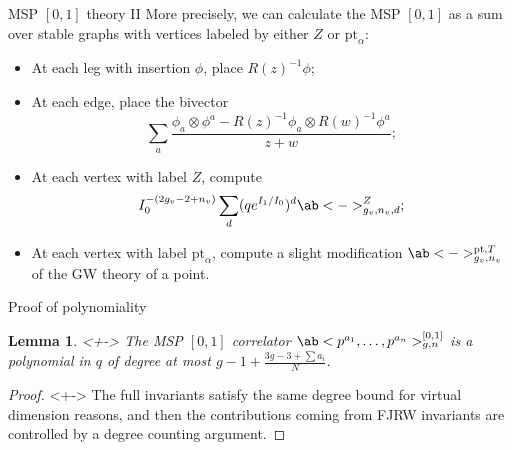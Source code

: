 \documentclass[10pt]{beamer}
\newcommand{\mr}[1]{\mathrm{#1}}
\newcommand{\1}{\mathbf{1}}
\newcommand{\2}{\mathbf{2}}
\newcommand{\3}{\mathbf{3}}
\newcommand{\pt}{\mr{pt}}
\newtheorem{lem}[thm]{Lemma}
\theoremstyle{definition}
\theoremstyle{remark}
\theoremstyle{plain}
\theoremstyle{definition}
\theoremstyle{remark}
\begin{document}
\begin{frame}{MSP $[0,1]$ theory II}
  More precisely, we can calculate the MSP $[0,1]$ as a sum over stable graphs with vertices labeled by either $Z$ or $\pt_{\alpha}$:
  \begin{itemize}[<+->]
    \item At each leg with insertion $\phi$, place $R(z)^{-1}\phi$;
    \item At each edge, place the bivector
    \[ \sum_{a} \frac{\phi_a \otimes \phi^a - R(z)^{-1}\phi_a \otimes R(w)^{-1} \phi^a}{z+w}; \]
    \item At each vertex with label $Z$, compute
    \[ I_0^{-(2g_v-2+n_v)}\sum_d (q e^{I_1/I_0})^d \ab<->_{g_v, n_v, d}^Z; \]
    \item At each vertex with label $\pt_{\alpha}$, compute a slight modification $\ab<->_{g_v, n_v}^{\pt, T}$ of the GW theory of a point.
  \end{itemize}
\end{frame}

\begin{frame}{Proof of polynomiality}
  \begin{lem}<+->
    The MSP $[0,1]$ correlator $\ab<p^{a_1}, \ldots, p^{a_n}>_{g,n}^{[0,1]}$ is a polynomial in $q$ of degree at most $g-1 + \frac{3g-3+\sum a_i}{N}$.
  \end{lem}
  \begin{proof}<+->
    The full invariants satisfy the same degree bound for virtual dimension reasons, and then the contributions coming from FJRW invariants are controlled by a degree counting argument.
  \end{proof}
\end{frame}
\end{document}
